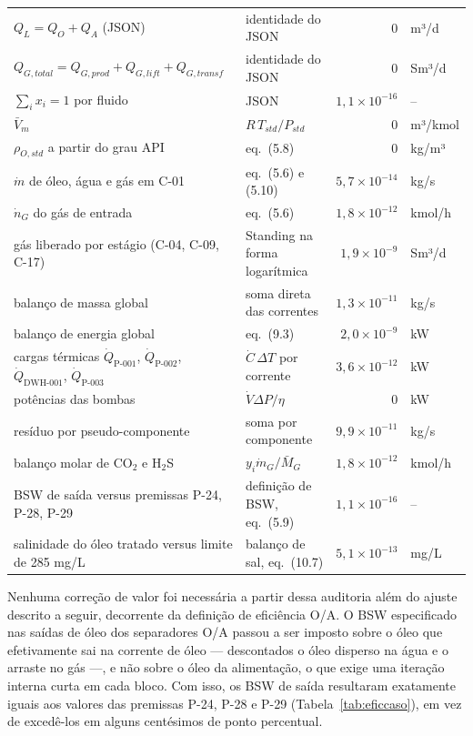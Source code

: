 \documentclass[11pt,a4paper]{article}
\numberwithin{equation}{section}
\numberwithin{table}{section}
\numberwithin{figure}{section}
\begin{document}
\begin{longtable}{L{6.8cm}L{4.4cm}rl}
$Q_L=Q_O+Q_A$ (JSON) & identidade do JSON & $0$ & m³/d\\
$Q_{G,total}=Q_{G,prod}+Q_{G,lift}+Q_{G,transf}$ & identidade do JSON & $0$ & Sm³/d\\
$\sum_i x_i=1$ por fluido & JSON & $1{,}1\times10^{-16}$ & --\\
$\bar V_m$ & $R\,T_{std}/P_{std}$ & $0$ & m³/kmol\\
$\rho_{O,std}$ a partir do grau API & eq.~(5.8) & $0$ & kg/m³\\
$\dot m$ de óleo, água e gás em C-01 & eq.~(5.6) e (5.10) & $5{,}7\times10^{-14}$ & kg/s\\
$\dot n_G$ do gás de entrada & eq.~(5.6) & $1{,}8\times10^{-12}$ & kmol/h\\
gás liberado por estágio (C-04, C-09, C-17) & Standing na forma logarítmica & $1{,}9\times10^{-9}$ & Sm³/d\\
balanço de massa global & soma direta das correntes & $1{,}3\times10^{-11}$ & kg/s\\
balanço de energia global & eq.~(9.3) & $2{,}0\times10^{-9}$ & kW\\
cargas térmicas $\dot Q_{\mbox{P-001}}$, $\dot Q_{\mbox{P-002}}$, $\dot Q_{\mbox{DWH-001}}$, $\dot Q_{\mbox{P-003}}$ & $\dot C\,\Delta T$ por corrente & $3{,}6\times10^{-12}$ & kW\\
potências das bombas & $\dot V\Delta P/\eta$ & $0$ & kW\\
resíduo por pseudo-componente & soma por componente & $9{,}9\times10^{-11}$ & kg/s\\
balanço molar de CO$_2$ e H$_2$S & $y_i\dot m_G/\bar M_G$ & $1{,}8\times10^{-12}$ & kmol/h\\
BSW de saída versus premissas P-24, P-28, P-29 & definição de BSW, eq.~(5.9) & $1{,}1\times10^{-16}$ & --\\
salinidade do óleo tratado versus limite de 285 mg/L & balanço de sal, eq.~(10.7) & $5{,}1\times10^{-13}$ & mg/L\\
\bottomrule\end{longtable}\normalsize
Nenhuma correção de valor foi necessária a partir dessa auditoria além do ajuste descrito a seguir, decorrente da definição de eficiência O/A. O BSW especificado nas saídas de óleo dos separadores O/A passou a ser imposto sobre o óleo que efetivamente sai na corrente de óleo --- descontados o óleo disperso na água e o arraste no gás ---, e não sobre o óleo da alimentação, o que exige uma iteração interna curta em cada bloco. Com isso, os BSW de saída resultaram exatamente iguais aos valores das premissas P-24, P-28 e P-29 (Tabela~\ref{tab:eficcaso}), em vez de excedê-los em alguns centésimos de ponto percentual.
\end{document}
